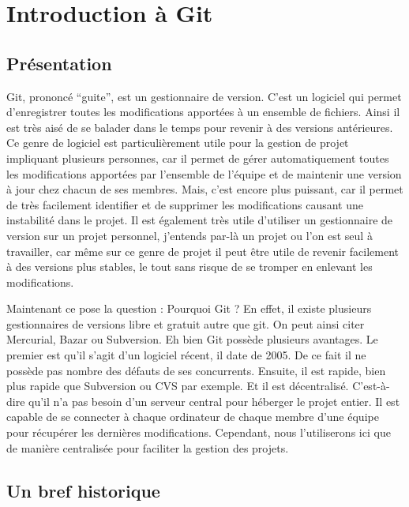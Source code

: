 \documentclass[a4paper]{article}
\begin{document}
\section{Introduction à Git}

\subsection{Présentation}

Git, prononcé “guite”, est un gestionnaire de version. C'est un logiciel qui permet d'enregistrer toutes les modifications apportées à un ensemble de fichiers. Ainsi il est très aisé de se \og balader dans le temps \fg pour revenir à des versions antérieures. Ce genre de logiciel est particulièrement utile pour la gestion de projet impliquant plusieurs personnes, car il permet de gérer automatiquement toutes les modifications apportées par l'ensemble de l'équipe et de maintenir une version à jour chez chacun de ses membres. Mais, c'est encore plus puissant, car il permet de très facilement identifier et de supprimer les modifications causant une instabilité dans le projet. Il est également très utile d'utiliser un gestionnaire de version sur un projet personnel, j'entends par-là un projet ou l'on est seul à travailler, car même sur ce genre de projet il peut être utile de revenir facilement à des versions plus stables, le tout sans risque de se tromper en enlevant les modifications.

Maintenant ce pose la question : Pourquoi Git ? En effet, il existe plusieurs gestionnaires de versions libre et gratuit autre que git. On peut ainsi citer Mercurial, Bazar ou Subversion. Eh bien Git possède plusieurs avantages. Le premier est qu'il s'agit d'un logiciel récent, il date de 2005. De ce fait il ne possède pas nombre des défauts de ses concurrents. Ensuite, il est rapide, bien plus rapide que Subversion ou CVS par exemple. Et il est décentralisé. C'est-à-dire qu'il n'a pas besoin d'un serveur central pour héberger le projet entier. Il est capable de se connecter à chaque ordinateur de chaque membre d'une équipe pour récupérer les dernières modifications. Cependant, nous l'utiliserons ici que de manière centralisée pour faciliter la gestion des projets.

\subsection{Un bref historique}
\end{document}
